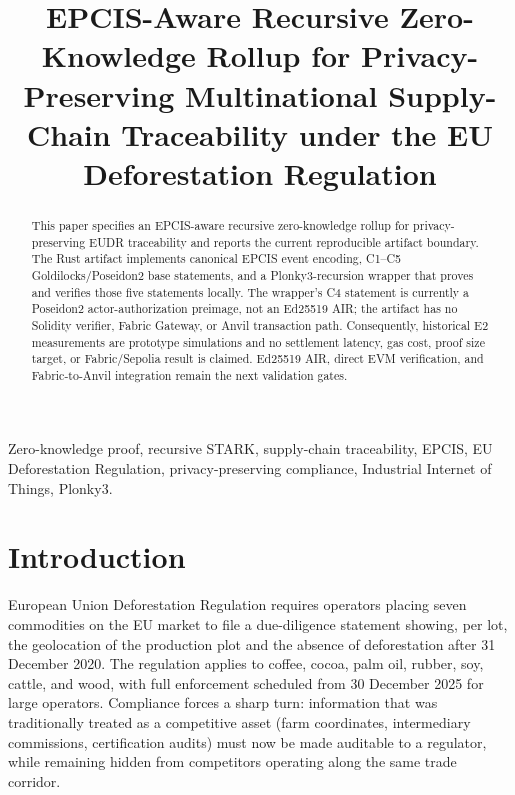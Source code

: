 \documentclass[journal]{IEEEtran}
\begin{document}
\title{EPCIS-Aware Recursive Zero-Knowledge Rollup for Privacy-Preserving Multinational Supply-Chain Traceability under the EU Deforestation Regulation}



\maketitle

\begin{abstract}
This paper specifies an EPCIS-aware recursive zero-knowledge rollup for privacy-preserving EUDR traceability and reports the current reproducible artifact boundary. The Rust artifact implements canonical EPCIS event encoding, C1--C5 Goldilocks/Poseidon2 base statements, and a Plonky3-recursion wrapper that proves and verifies those five statements locally. The wrapper's C4 statement is currently a Poseidon2 actor-authorization preimage, not an Ed25519 AIR; the artifact has no Solidity verifier, Fabric Gateway, or Anvil transaction path. Consequently, historical E2 measurements are prototype simulations and no settlement latency, gas cost, proof size target, or Fabric/Sepolia result is claimed. Ed25519 AIR, direct EVM verification, and Fabric-to-Anvil integration remain the next validation gates.
\end{abstract}

\begin{IEEEkeywords}
Zero-knowledge proof, recursive STARK, supply-chain traceability, EPCIS, EU Deforestation Regulation, privacy-preserving compliance, Industrial Internet of Things, Plonky3.
\end{IEEEkeywords}

\section{Introduction}
 European Union Deforestation Regulation requires operators placing seven commodities on the EU market to file a due-diligence statement showing, per lot, the geolocation of the production plot and the absence of deforestation after 31 December 2020. The regulation applies to coffee, cocoa, palm oil, rubber, soy, cattle, and wood, with full enforcement scheduled from 30 December 2025 for large operators. Compliance forces a sharp turn: information that was traditionally treated as a competitive asset (farm coordinates, intermediary commissions, certification audits) must now be made auditable to a regulator, while remaining hidden from competitors operating along the same trade corridor.
\end{document}
